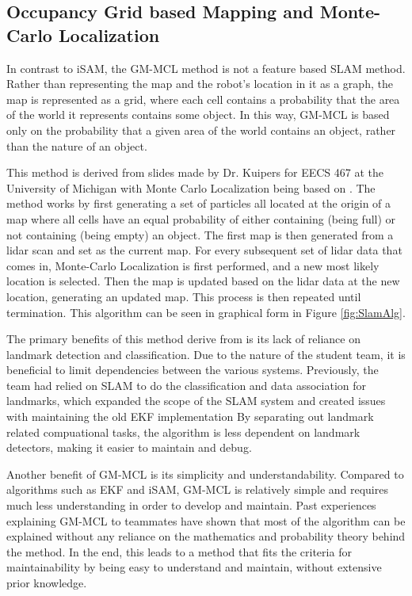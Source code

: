 \documentclass[10pt]{IEEEtran}
\begin{document}
\subsection{Occupancy Grid based Mapping and Monte-Carlo Localization}
In contrast to iSAM, the GM-MCL method is not a feature based SLAM method.  Rather than representing
the map and the robot's location in it as a graph, the map is represented
as a grid, where each cell contains a probability that the area of the world it represents 
contains some object.  In this way, GM-MCL is based only on the probability that a given area
of the world contains an  object, rather than the nature of an object.

This method is derived from slides made by Dr. Kuipers for EECS 467 at the University of
Michigan with Monte Carlo Localization being based on \cite{MCL}.  The method works by first generating a set of particles all located at the origin
of a map where all cells have an equal probability of either containing (being full) or
not containing (being empty) an object.  The first map is then generated from a
lidar scan and set as the current map.  For every subsequent set of lidar data that comes in,
Monte-Carlo Localization is first performed, and a new most likely location is selected.
Then the map is updated based on the lidar data at the new location, generating an
updated map.  This process is then repeated until termination.  This algorithm
can be seen in graphical form in Figure \ref{fig:SlamAlg}. 

The primary benefits of this method derive from is its lack of reliance
on landmark detection and classification.  Due to the nature of the student team, it is 
beneficial to limit dependencies between the various systems.  Previously, the team had
relied on SLAM to do the classification and data association for landmarks, which 
expanded the scope of the SLAM system and created issues with maintaining the old EKF
implementation
By separating out landmark related compuational tasks, the 
algorithm is less dependent on landmark detectors, making it easier to maintain and debug.

Another benefit of GM-MCL is its simplicity and understandability.  Compared to algorithms
such as EKF and iSAM, GM-MCL is relatively simple and requires much less understanding in 
order to develop and maintain.  Past experiences explaining GM-MCL to teammates have shown
that most of the algorithm can be explained without any reliance on the mathematics and 
probability theory behind the method.  In the end, this leads to a method that fits the
criteria for maintainability by being easy to understand and maintain, without extensive prior knowledge.
\end{document}
